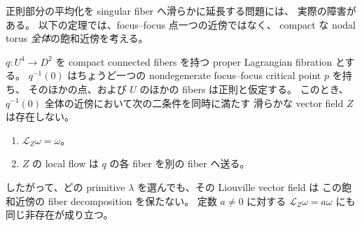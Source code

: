 正則部分の平均化を singular fiber へ滑らかに延長する問題には、
実際の障害がある。
以下の定理では、focus--focus 点一つの近傍ではなく、
compact な nodal torus \emph{全体}の飽和近傍を考える。

\begin{theorem}
\label{lc:liouville-no-focus}
$q:U^4\to D^2$ を compact connected fibers を持つ proper Lagrangian fibration とする。
$q^{-1}(0)$ はちょうど一つの nondegenerate focus--focus critical point $p$ を持ち、
そのほかの点、および $U$ のほかの fibers は正則と仮定する。
このとき、$q^{-1}(0)$ 全体の近傍において次の二条件を同時に満たす
滑らかな vector field $Z$ は存在しない。
\begin{enumerate}
\item $\mathcal L_Z\omega=\omega$。
\item $Z$ の local flow は $q$ の各 fiber を別の fiber へ送る。
\end{enumerate}
したがって、どの primitive $\lambda$ を選んでも、その Liouville vector field は
この飽和近傍の fiber decomposition を保たない。
定数 $a\ne0$ に対する $\mathcal L_Z\omega=a\omega$ にも同じ非存在が成り立つ。
\end{theorem}

